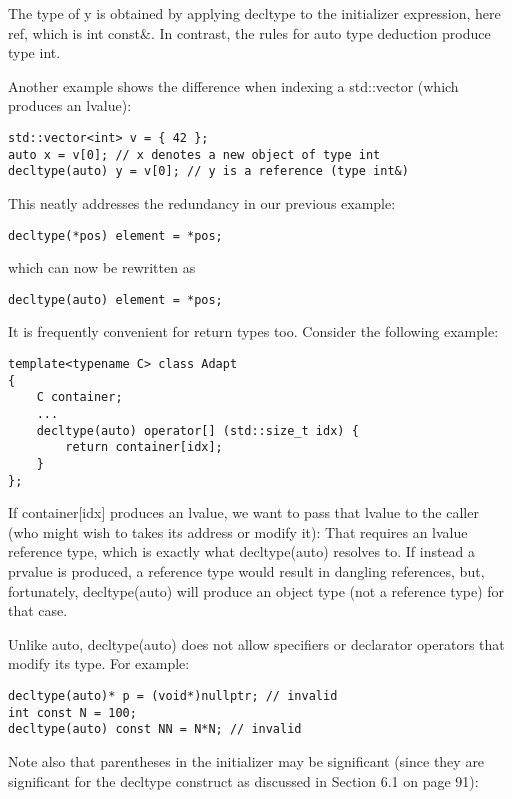 The type of y is obtained by applying decltype to the initializer expression, here ref, which is int const\&. In contrast, the rules for auto type deduction produce type int.

Another example shows the difference when indexing a std::vector (which produces an lvalue):

\begin{lstlisting}[style=styleCXX]
std::vector<int> v = { 42 };
auto x = v[0]; // x denotes a new object of type int
decltype(auto) y = v[0]; // y is a reference (type int&)
\end{lstlisting}

This neatly addresses the redundancy in our previous example:

\begin{lstlisting}[style=styleCXX]
decltype(*pos) element = *pos;
\end{lstlisting}

which can now be rewritten as

\begin{lstlisting}[style=styleCXX]
decltype(auto) element = *pos;
\end{lstlisting}

It is frequently convenient for return types too. Consider the following example:

\begin{lstlisting}[style=styleCXX]
template<typename C> class Adapt
{
	C container;
	...
	decltype(auto) operator[] (std::size_t idx) {
		return container[idx];
	}
};
\end{lstlisting}

If container[idx] produces an lvalue, we want to pass that lvalue to the caller (who might wish to takes its address or modify it): That requires an lvalue reference type, which is exactly what decltype(auto) resolves to. If instead a prvalue is produced, a reference type would result in dangling references, but, fortunately, decltype(auto) will produce an object type (not a reference type) for that case.

Unlike auto, decltype(auto) does not allow specifiers or declarator operators that modify its type. For example:

\begin{lstlisting}[style=styleCXX]
decltype(auto)* p = (void*)nullptr; // invalid
int const N = 100;
decltype(auto) const NN = N*N; // invalid
\end{lstlisting}

Note also that parentheses in the initializer may be significant (since they are significant for the decltype construct as discussed in Section 6.1 on page 91):

